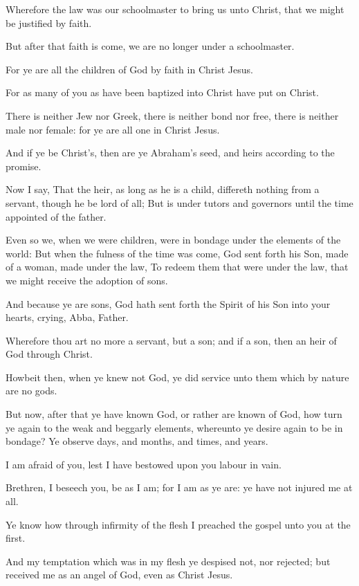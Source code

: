 \Verse Wherefore the law was our schoolmaster to bring us unto Christ, that we might be justified by faith.

\Verse But after that faith is come, we are no longer under a schoolmaster.

\Verse For ye are all the children of God by faith in Christ Jesus.

\Verse For as many of you as have been baptized into Christ have put on Christ.

\Verse There is neither Jew nor Greek, there is neither bond nor free, there is neither male nor female: for ye are all one in Christ Jesus.

\Verse And if ye be Christ's, then are ye Abraham's seed, and heirs according to the promise.


\Chapter
\Verse Now I say, That the heir, as long as he is a child, differeth nothing from a servant, though he be lord of all; \Verse But is under tutors and governors until the time appointed of the father.

\Verse Even so we, when we were children, were in bondage under the elements of the world: \Verse But when the fulness of the time was come, God sent forth his Son, made of a woman, made under the law, \Verse To redeem them that were under the law, that we might receive the adoption of sons.

\Verse And because ye are sons, God hath sent forth the Spirit of his Son into your hearts, crying, Abba, Father.

\Verse Wherefore thou art no more a servant, but a son; and if a son, then an heir of God through Christ.

\Verse Howbeit then, when ye knew not God, ye did service unto them which by nature are no gods.

\Verse But now, after that ye have known God, or rather are known of God, how turn ye again to the weak and beggarly elements, whereunto ye desire again to be in bondage?  \Verse Ye observe days, and months, and times, and years.

\Verse I am afraid of you, lest I have bestowed upon you labour in vain.

\Verse Brethren, I beseech you, be as I am; for I am as ye are: ye have not injured me at all.

\Verse Ye know how through infirmity of the flesh I preached the gospel unto you at the first.

\Verse And my temptation which was in my flesh ye despised not, nor rejected; but received me as an angel of God, even as Christ Jesus.

